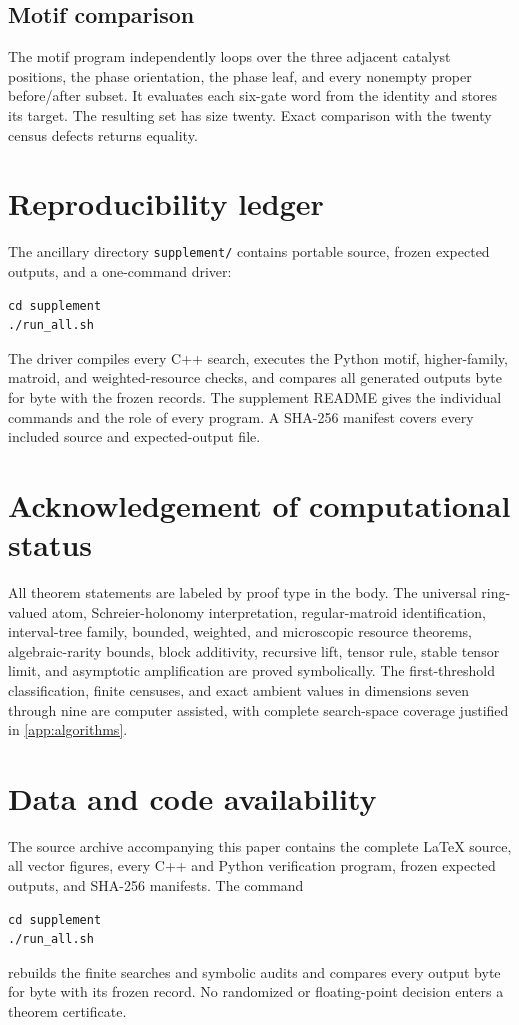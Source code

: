 \subsection{Motif comparison}

The motif program independently loops over the three adjacent catalyst positions, the phase orientation, the phase leaf, and every nonempty proper before/after subset.  It evaluates each six-gate word from the identity and stores its target.  The resulting set has size twenty.  Exact comparison with the twenty census defects returns equality.

\section{Reproducibility ledger}\label{app:reproducibility}

The ancillary directory \texttt{supplement/} contains portable source, frozen expected outputs, and a one-command driver:
\begin{verbatim}
cd supplement
./run_all.sh
\end{verbatim}
The driver compiles every C++ search, executes the Python motif, higher-family, matroid, and weighted-resource checks, and compares all generated outputs byte for byte with the frozen records.  The supplement README gives the individual commands and the role of every program.  A SHA-256 manifest covers every included source and expected-output file.

\section*{Acknowledgement of computational status}

All theorem statements are labeled by proof type in the body.  The universal ring-valued atom, Schreier-holonomy interpretation, regular-matroid identification, interval-tree family, bounded, weighted, and microscopic resource theorems, algebraic-rarity bounds, block additivity, recursive lift, tensor rule, stable tensor limit, and asymptotic amplification are proved symbolically.  The first-threshold classification, finite censuses, and exact ambient values in dimensions seven through nine are computer assisted, with complete search-space coverage justified in \cref{app:algorithms}.

\section*{Data and code availability}

The source archive accompanying this paper contains the complete LaTeX source, all vector figures, every C++ and Python verification program, frozen expected outputs, and SHA-256 manifests.  The command
\begin{verbatim}
cd supplement
./run_all.sh
\end{verbatim}
rebuilds the finite searches and symbolic audits and compares every output byte for byte with its frozen record.  No randomized or floating-point decision enters a theorem certificate.

